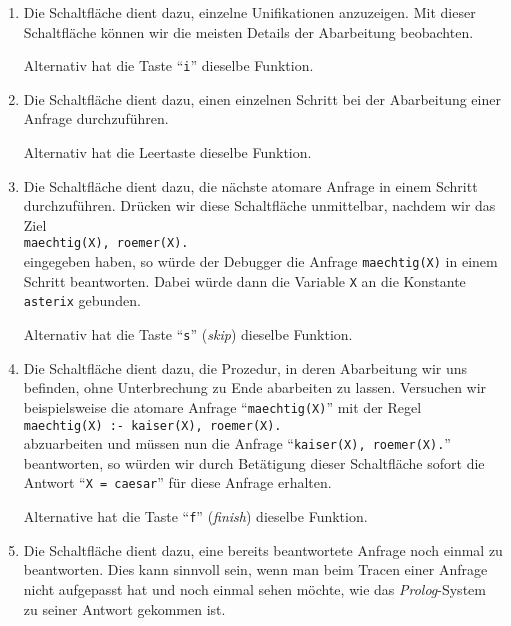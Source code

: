 \begin{enumerate}
\item Die Schaltfl\"{a}che 
      dient dazu, einzelne Unifikationen anzuzeigen.  Mit dieser Schaltfl\"{a}che
      k\"{o}nnen wir die meisten Details der Abarbeitung beobachten.

      Alternativ hat die Taste ``\texttt{i}'' dieselbe Funktion.
\item Die Schaltfl\"{a}che 
      dient dazu, einen einzelnen Schritt bei der Abarbeitung einer Anfrage
      durchzuf\"{u}hren.

      Alternativ hat die Leertaste dieselbe Funktion.
\item Die Schaltfl\"{a}che 
      dient dazu, die n\"{a}chste atomare Anfrage in einem Schritt durchzuf\"{u}hren.
      Dr\"{u}cken wir diese Schaltfl\"{a}che unmittelbar, nachdem wir das Ziel \\[0.2cm]
      \hspace*{1.3cm} \texttt{maechtig(X), roemer(X).} \\[0.2cm]
      eingegeben haben, so w\"{u}rde der Debugger die Anfrage
      \texttt{maechtig(X)} in einem Schritt beantworten.  Dabei w\"{u}rde dann die Variable
      \texttt{X} an die Konstante \texttt{asterix} gebunden.

      Alternativ hat die Taste ``\texttt{s}'' (\emph{skip}) dieselbe Funktion.
\item Die Schaltfl\"{a}che  dient dazu,
      die Prozedur, in deren Abarbeitung wir uns befinden, ohne Unterbrechung zu Ende
      abarbeiten zu lassen.  Versuchen wir beispielsweise die atomare Anfrage ``\texttt{maechtig(X)}''
      mit der Regel \\[0.2cm]
      \hspace*{1.3cm} \texttt{maechtig(X) :- kaiser(X), roemer(X).} \\[0.2cm]
      abzuarbeiten und m\"{u}ssen nun die Anfrage ``\texttt{kaiser(X), roemer(X).}''
      beantworten, so w\"{u}rden wir durch Bet\"{a}tigung dieser Schaltfl\"{a}che sofort die Antwort
      ``\texttt{X = caesar}'' f\"{u}r diese Anfrage erhalten.

      Alternative hat die Taste ``\texttt{f}'' (\emph{finish}) dieselbe Funktion.
\item Die Schaltfl\"{a}che  
      dient dazu, eine bereits beantwortete Anfrage noch einmal zu beantworten.
      Dies kann sinnvoll sein, wenn man beim Tracen einer Anfrage nicht aufgepasst hat
      und noch einmal sehen m\"{o}chte, wie das \textsl{Prolog}-System zu seiner Antwort
      gekommen ist.
      

\end{enumerate}

